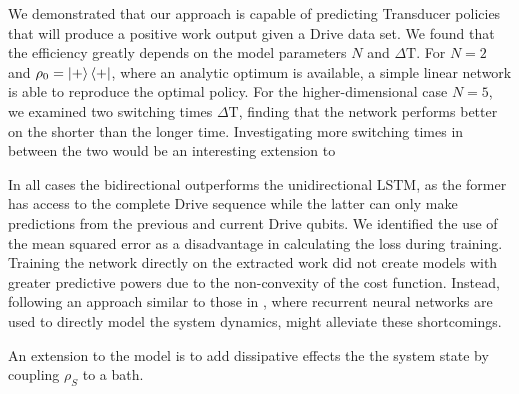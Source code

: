 We demonstrated that our approach is capable of predicting Transducer policies that will produce a positive work output given a Drive data set.
We found that the efficiency greatly depends on the model parameters $N$ and $\Delta \mathrm{T}$.
For $N=2$ and $\rho_0 = \ket{+}\bra{+}$, where an analytic optimum is available, a simple linear network is able to reproduce the optimal policy.
For the higher-dimensional case $N=5$, we examined two switching times $\Delta \mathrm{T}$, finding that the network performs better on the shorter than the longer time.
Investigating more switching times in between the two would be an interesting extension to 

In all cases the bidirectional outperforms the unidirectional LSTM, as the former has access to the complete Drive sequence while the latter can only make predictions from the previous and current Drive qubits.
We identified the use of the mean squared error as a disadvantage in calculating the loss during training.
Training the network directly on the extracted work did not create models with greater predictive powers due to the non-convexity of the cost function.
Instead, following an approach similar to those in \cite{Banchi_2018, PhysRevX.10.011006}, where recurrent neural networks are used to directly model the system dynamics, might alleviate these shortcomings.

An extension to the model is to add dissipative effects the the system state by coupling $\rho_S$ to a bath.